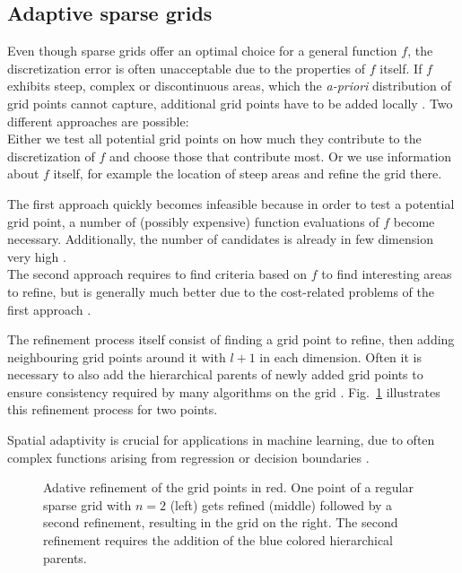 \subsection{Adaptive sparse grids}\label{subsec:ada}

Even though sparse grids offer an optimal choice for a general function $f$,
the discretization error is often unacceptable due to
the properties of $f$ itself. If $f$ exhibits steep, complex
or discontinuous areas, which the \emph{a-priori} distribution of grid points
cannot capture, additional grid points have to be added locally
\cite{disspfl}.
Two different approaches are possible: \\
Either we test all potential grid points on how much they contribute
to the discretization of $f$ and choose those that contribute most.
Or we use information about $f$ itself, for example the location of
steep areas
and refine the grid there.
\par
The first approach quickly becomes infeasible because in order to test
a potential grid point, a number of
(possibly expensive) function evaluations of $f$ become necessary. Additionally,
the number of candidates is already in few dimension very high \cite{disspfl}. \\
The second approach requires to find criteria based on $f$ to
find interesting areas to refine, but is generally much better due to the
cost-related problems of the first approach \cite{disspfl}.
\par
The refinement process itself consist of finding a grid point to refine,
then adding neighbouring grid points around it with $l + 1$ in each dimension.
Often it is necessary to also add the hierarchical parents of newly added
grid points to ensure consistency required by many algorithms on the grid
\cite{disspfl}.
Fig.~\ref{fig:fig3} illustrates this refinement process for two points.
\par
Spatial adaptivity is crucial for applications in machine learning, due to
often complex functions arising from regression or decision boundaries
\cite{disspfl, artbunshort}.

\begin{figure}[t!]
  \centering
  
  \hspace{20px}
  
  \hspace{20px}
  
  \captionsetup{width=0.65\textwidth}
  \caption{Adative refinement of the grid points in red. One point
    of a regular sparse grid with $n = 2$ (left) gets refined (middle)
    followed by a second refinement, resulting in the grid on the right.
    The second refinement requires the addition of the blue
    colored hierarchical parents.
    \label{fig:fig3}}
\end{figure}


